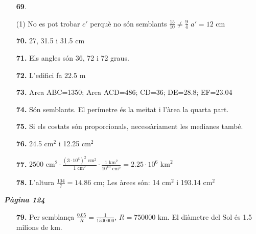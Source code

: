 \documentclass[a4paper, pdf, twoside]{book}
\begin{document}
\begin{multicols}{2}
\begin{enumerate}
 \item[\fontfamily{phv}\selectfont\color{blue}\textbf{69}. ] 
 \begin{tasks}[column-sep=1em, item-indent=1.3333em](1)
	 \task* No es pot trobar $c'$ perquè no són semblants $\frac {15}{10}\neq \frac {9}{4}$
	 \task $a'=12$ cm
\end{tasks}
\vspace{0.25cm}
\item[\fontfamily{phv}\selectfont\color{blue}\textbf{70. }] 
27, 31.5 i 31.5 cm
\vspace{0.25cm}
\item[\fontfamily{phv}\selectfont\color{blue}\textbf{71. }] 
Els angles són 36, 72 i 72 graus.
\vspace{0.25cm}
\item[\fontfamily{phv}\selectfont\color{blue}\textbf{72. }] 
L'edifici fa 22.5 m
\vspace{0.25cm}
\item[\fontfamily{phv}\selectfont\color{blue}\textbf{73. }] 
Area ABC=1350; Area ACD=486; CD=36; DE=28.8; EF=23.04
\vspace{0.25cm}
\item[\fontfamily{phv}\selectfont\color{blue}\textbf{74. }] 
Són semblants. El perímetre és la meitat i l'àrea la quarta part.
\vspace{0.25cm}
\item[\fontfamily{phv}\selectfont\color{blue}\textbf{75. }] 
Si els costats són proporcionals, necessàriament les medianes també.
\vspace{0.25cm}
\item[\fontfamily{phv}\selectfont\color{blue}\textbf{76. }] 
24.5 cm$^2$ i 12.25 cm$^2$
\vspace{0.25cm}
\item[\fontfamily{phv}\selectfont\color{blue}\textbf{77. }] 
$2500 \text { cm}{}^2 \cdot \frac {(3\cdot 10^6)^2 \text { cm}{}^2}{1 \text { cm}{}^2}\cdot \frac {1 \text { km}{}^2}{10^{10} \text { cm}{}^2} = 2.25 \cdot 10^6 \text { km}^2$
\vspace{0.25cm}
\item[\fontfamily{phv}\selectfont\color{blue}\textbf{78. }] 
L'altura $\frac {104}{7}=14.86$ cm; Les àrees són: 14 cm$^2$ i 193.14 cm$^2$
 \end{enumerate}
\vspace{0.3cm}


{\textbf{\em Pàgina 124}} \hrulefill
\begin{enumerate}
\vspace{0.25cm}
\item[\fontfamily{phv}\selectfont\color{blue}\textbf{79. }] 
Per semblança $\frac {0.05}{R}=\frac {1}{1 500 000}$, $R=750 000$ km. El diàmetre del Sol és 1.5 milions de km.
 \end{enumerate}
\begin{enumerate}
\vspace{0.25cm}



\end{enumerate}
\end{multicols}
\end{document}
